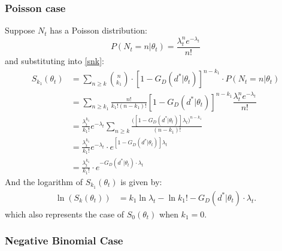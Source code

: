 \documentclass{article}
\begin{document}
\subsubsection{Poisson case}\label{poisec}
Suppose $N_t$ has a Poisson distribution:
$$
P(N_t = n|\theta_t) = \dfrac{\lambda_t^n e^{-\lambda_t}}{n!}
$$
and substituting into \eqref{snk}:
\begin{equation}\label{poissonlikelihood}
\begin{aligned}
    S_{k_1}(\theta_t) & = \sum\limits_{n \geq k} \binom{n}{k_1}   \cdot \left[1 - G_D(d^*|\theta_t)\right]^{n - k_1} \cdot P(N_t = n|\theta_t) \\
    & = \sum\limits_{n \geq k_1} \frac{n!}{k_1! (n - k_1)!} \left[1 - G_D(d^*|\theta_t)\right]^{n - k_1} \dfrac{\lambda_t^n e^{-\lambda_t}}{n!} 
    \\ & = \frac{\lambda_t^{k_1}}{k_1!} e^{-\lambda_t}  \sum\limits_{n \geq k} \frac{\big(\left[1 - G_D(d^*|\theta_t)\right] \lambda_t\big)^{n-k_1}}{(n - k_1)!} 
    \\ & = \frac{\lambda_t^{k_1}}{k_1!} e^{-\lambda_t} \cdot e^{[1 - G_D(d^*|\theta_t)]\lambda_t}
    \\ & = \frac{\lambda_t^{k_1}}{k_1!}\cdot e^{ - G_D(d^*|\theta_t)\cdot \lambda_t}
\end{aligned}
\end{equation}
And the logarithm of $S_{k_1}(\theta_t)$ is given by:
\begin{equation}\label{poissonloglikelihood}
\begin{aligned}
\ln{\left(S_k(\theta_t)\right)} & = k_1 \ln{\lambda_t} - \ln{k_1!} - G_D(d^*|\theta_t)\cdot \lambda_t.
\end{aligned}
\end{equation}
which also represents the case of $S_0(\theta_t)$ when $k_1 = 0$. 

\subsubsection{Negative Binomial Case}\label{negbinsect}
\end{document}
